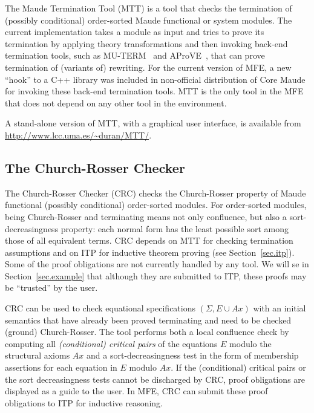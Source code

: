 The Maude Termination Tool (MTT) is a tool that checks the
termination of (possibly conditional) order-sorted
Maude functional or system modules. 
The current implementation takes a module
as input and tries to prove its termination by applying 
{theory transformations} and then invoking back-end termination tools,
such as MU-TERM~\cite{Lucas:2004} and AProVE~\cite{Giesl-Schneider-Kamp-Thiemann:2006}, that can prove termination of (variants of) rewriting.
For the current version of MFE, a new ``hook'' to a C++
library was included in non-official distribution of
Core Maude for invoking these back-end termination tools.
MTT is the only tool in the MFE
that does not depend on any other tool in the environment.

A stand-alone version of MTT, with a graphical user interface,
is available from \url{http://www.lcc.uma.es/~duran/MTT/}.

\subsection{The Church-Rosser Checker}
\label{sec.crc}

The Church-Rosser Checker (CRC) checks the
Church-Rosser property of Maude functional (possibly conditional)
order-sorted modules. For order-sorted modules, being Church-Rosser
and terminating means not only confluence, but also a 
{sort-decreasingness} property: each normal form has the least possible
sort among those of all equivalent terms.
CRC depends on MTT for checking termination assumptions
and on ITP for inductive theorem proving (see Section~\ref{sec.itp}).
Some of the proof obligations are not currently 
handled by any tool. We will se in Section~\ref{sec.example} that 
although they are submitted to ITP, these proofs may be ``trusted'' by the user.

CRC can be used to check equational specifications 
$(\Sigma,E\cup Ax)$ with an initial semantics that have already 
been proved terminating and need to be checked
(ground) Church-Rosser. The tool performs both a local confluence check
by computing all {\em (conditional) critical pairs} of the equations $E$
modulo the structural axioms $Ax$ 
and a sort-decreasingness test in the form of membership assertions
for each equation in $E$ modulo $Ax$. If the 
(conditional) critical pairs or the sort decreasingness tests cannot
be discharged by CRC, proof obligations 
are displayed as a guide to the user. In MFE, CRC can submit these
proof obligations to ITP for inductive
reasoning. 

